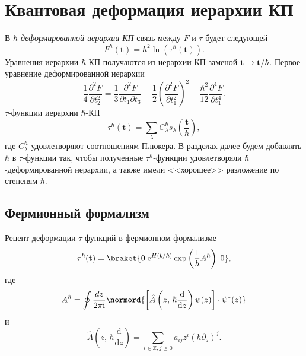 \documentclass[a4paper, 14pt]{extarticle}
\begin{document}
\section{Квантовая деформация иерархии КП}


В $\hbar $\emph{-деформированной иерархии КП} связь между $F$ и $\tau$ будет следующей
\begin{equation}
	F^\hbar \left( \mathbf{t} \right) =
	\hbar ^2 \ln \left( \tau^\hbar \left( \mathbf{t} \right)  \right) 
.\end{equation} 
Уравнения иерархии $\hbar$-КП получаются  из
иерархии КП заменой  $\mathbf{t}\to \mathbf{t} /\hbar $.
Первое уравнение деформированной иерархии
\begin{equation}
	\frac{1}{4} \frac{\partial ^2 F}{\partial t_2^2} =\frac{1}{3} \frac{\partial ^2 F}{\partial t_1 \partial t_3} -\frac{1}{2} \left( \frac{\partial^2 F}{\partial t_1^2} \right) ^2-\frac{\hbar ^2}{12} \frac{\partial^4 F}{
	\partial t_1^4}
.\end{equation} 
$\tau$-функции  иерархии $\hbar $-КП
\begin{equation}
	\tau^\hbar \left( \mathbf{t} \right) =
	\sum_{\lambda}^{} C_\lambda^\hbar 
	s_\lambda \left( \frac{\mathbf{t}}{\hbar } \right) 
	\label{eq:3}
,\end{equation} 
где $C^\hbar _{\lambda}$ удовлетворяют соотношениям Плюкера.
В разделах далее будем добавлять $\hbar $
в $\tau$-функции так, чтобы полученные $\tau^\hbar $-функции
удовлетворяли $\hbar$-деформированной иерархии, а также
имели  <<хорошее>> разложение по степеням $\hbar $.
\subsection{Фермионный формализм}
Рецепт деформации $\tau$-функций в фермионном формализме
\begin{equation}
	\tau^\hbar (\mathbf{t})= \braket{0 | \mathrm{e} ^{H\left( \mathbf{t} /\hbar  \right) } \exp \left( \frac{1}{\hbar }A^\hbar  \right) | 0}
,\end{equation} 
где
\begin{equation}
A^\hbar = \oint \frac{dz}{2\pi \mathrm{i} }
\normord{\left[ \hat{A}\left( z,\,\hbar \frac{\mathrm{d} }{\mathrm{d} z}\right)\psi(z)   \right] \cdot \psi^*(z)}
\end{equation} 
и
\begin{equation}
	\hat{A}\left( z,\,\hbar  \frac{\mathrm{d} }{\mathrm{d} z} \right) = \sum_{i \in \mathbb{Z},j\ge 0}^{} a_{ij}
	z^i \left( \hbar  \partial_z \right) ^j
.\end{equation} 
\end{document}
